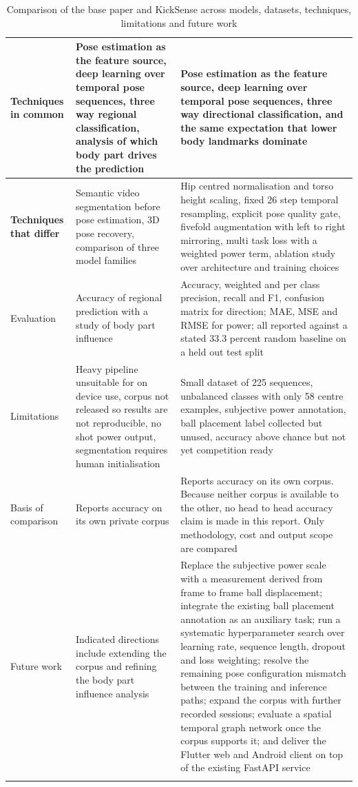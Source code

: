 \begin{longtable}{|>{\raggedright\arraybackslash\bfseries}p{2.6cm}|
>{\raggedright\arraybackslash}p{5.6cm}|
>{\raggedright\arraybackslash}p{5.6cm}|}
Techniques in common &
Pose estimation as the feature source, deep learning over temporal pose sequences, three way regional classification, analysis of which body part drives the prediction &
Pose estimation as the feature source, deep learning over temporal pose sequences, three way directional classification, and the same expectation that lower body landmarks dominate \\ \hline

Techniques that differ &
Semantic video segmentation before pose estimation, 3D pose recovery, comparison of three model families &
Hip centred normalisation and torso height scaling, fixed 26 step temporal resampling, explicit pose quality gate, fivefold augmentation with left to right mirroring, multi task loss with a weighted power term, ablation study over architecture and training choices \\ \hline

Evaluation &
Accuracy of regional prediction with a study of body part influence &
Accuracy, weighted and per class precision, recall and F1, confusion matrix for direction; MAE, MSE and RMSE for power; all reported against a stated 33.3 percent random baseline on a held out test split \\ \hline

Limitations &
Heavy pipeline unsuitable for on device use, corpus not released so results are not reproducible, no shot power output, segmentation requires human initialisation &
Small dataset of 225 sequences, unbalanced classes with only 58 centre examples, subjective power annotation, ball placement label collected but unused, accuracy above chance but not yet competition ready \\ \hline

Basis of comparison &
Reports accuracy on its own private corpus &
Reports accuracy on its own corpus. Because neither corpus is available to the other, no head to head accuracy claim is made in this report. Only methodology, cost and output scope are compared \\ \hline

Future work &
Indicated directions include extending the corpus and refining the body part influence analysis &
Replace the subjective power scale with a measurement derived from frame to frame ball displacement; integrate the existing ball placement annotation as an auxiliary task; run a systematic hyperparameter search over learning rate, sequence length, dropout and loss weighting; resolve the remaining pose configuration mismatch between the training and inference paths; expand the corpus with further recorded sessions; evaluate a spatial temporal graph network once the corpus supports it; and deliver the Flutter web and Android client on top of the existing FastAPI service \\ \hline

\caption{Comparison of the base paper and KickSense across models, datasets, techniques, limitations and future work}
\label{tab:basepaper-compare}
\end{longtable}
\normalsize

